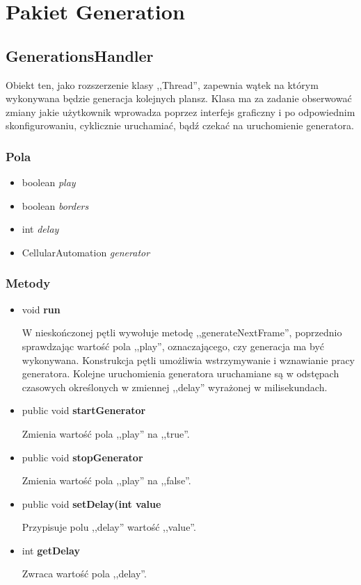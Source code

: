 \documentclass[a4paper,11pt]{article}
\begin{document}
\section{Pakiet Generation}



\subsection{GenerationsHandler}
Obiekt ten, jako rozszerzenie klasy ,,Thread'', zapewnia wątek na którym wykonywana będzie generacja kolejnych plansz. Klasa ma za zadanie obserwować zmiany jakie użytkownik wprowadza poprzez interfejs graficzny i po odpowiednim skonfigurowaniu, cyklicznie uruchamiać, bądź czekać na uruchomienie generatora.

\subsubsection{Pola}
\begin{itemize}
\item boolean \textit{play}
\item boolean \textit{borders}
\item int \textit{delay}
\item CellularAutomation \textit{generator}
\end{itemize}

\subsubsection{Metody}
\begin{itemize}
\item void  \textbf{run}

W nieskończonej pętli wywołuje metodę ,,generateNextFrame'', poprzednio sprawdzając wartość pola ,,play'', oznaczającego, czy generacja ma być wykonywana. Konstrukcja pętli umożliwia wstrzymywanie i wznawianie pracy generatora.
Kolejne uruchomienia generatora uruchamiane są w odstępach czasowych określonych w zmiennej ,,delay'' wyrażonej w milisekundach.
\item public void  \textbf{startGenerator}

Zmienia wartość pola ,,play'' na ,,true''.
\item public void  \textbf{stopGenerator}

Zmienia wartość pola ,,play'' na ,,false''.
\item public void  \textbf{setDelay(int value}

Przypisuje polu ,,delay'' wartość ,,value''.

\item int  \textbf{getDelay}

Zwraca wartość pola ,,delay''.

\end{itemize}
\end{document}
